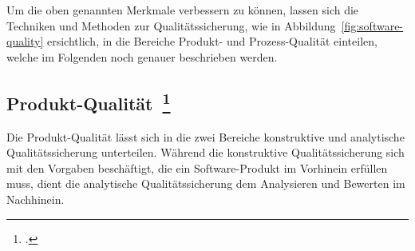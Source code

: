 Um die oben genannten Merkmale verbessern zu können, lassen sich die Techniken und Methoden zur Qualitätssicherung, wie in Abbildung~\ref{fig:software-quality} ersichtlich, in die Bereiche Produkt- und Prozess-Qualität einteilen, welche im Folgenden noch genauer beschrieben werden.

\subsection[Produkt-Qualität]{Produkt-Qualität~\footcite[vgl.][Kapitel 1.4.1]{hoffmann_software_qualitat_2013}}

Die Produkt-Qualität lässt sich in die zwei Bereiche konstruktive und analytische Qualitätssicherung unterteilen.
Während die konstruktive Qualitätssicherung sich mit den Vorgaben beschäftigt, die ein Software-Produkt im Vorhinein erfüllen muss, dient die analytische Qualitätssicherung dem Analysieren und Bewerten im Nachhinein.

